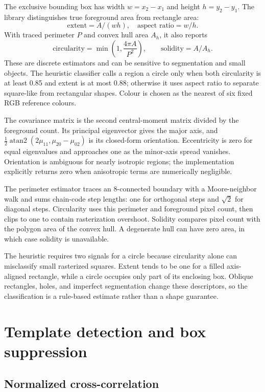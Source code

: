 \documentclass[11pt,a4paper]{article}
\newcommand{\1}{\mathbf{1}}
\begin{document}
The exclusive bounding box has width $w=x_2-x_1$ and height $h=y_2-y_1$.
The library distinguishes true foreground area from rectangle area:
\[
 \text{extent}=A/(wh),\quad \text{aspect ratio}=w/h.
\]
With traced perimeter $P$ and convex hull area $A_h$, it also reports
\[
 \text{circularity}=\min\!\left(1,\frac{4\pi A}{P^2}\right),\qquad
 \text{solidity}=A/A_h.
\]
These are discrete estimators and can be sensitive to segmentation and small
objects. The heuristic classifier calls a region a circle only when both
circularity is at least 0.85 and extent is at most 0.88; otherwise it uses
aspect ratio to separate square-like from rectangular shapes. Colour is chosen
as the nearest of six fixed RGB reference colours.

The covariance matrix is the second central-moment matrix divided by the
foreground count. Its principal eigenvector gives the major axis, and
$\tfrac12\operatorname{atan2}(2\mu_{11},\mu_{20}-\mu_{02})$ is its closed-form
orientation. Eccentricity is zero for equal eigenvalues and approaches one as
the minor-axis spread vanishes. Orientation is ambiguous for nearly isotropic
regions; the implementation explicitly returns zero when anisotropic terms
are numerically negligible.

The perimeter estimator traces an 8-connected boundary with a Moore-neighbor
walk and sums chain-code step lengths: one for orthogonal steps and $\sqrt2$
for diagonal steps. Circularity uses this perimeter and foreground pixel
count, then clips to one to contain rasterization overshoot. Solidity compares
pixel count with the polygon area of the convex hull. A degenerate hull can
have zero area, in which case solidity is unavailable.

The heuristic requires two signals for a circle because circularity alone can
misclassify small rasterized squares. Extent tends to be one for a filled
axis-aligned rectangle, while a circle occupies only part of its enclosing
box. Oblique rectangles, holes, and imperfect segmentation change these
descriptors, so the classification is a rule-based estimate rather than a
shape guarantee.

\section{Template detection and box suppression}

\subsection{Normalized cross-correlation}
\end{document}

